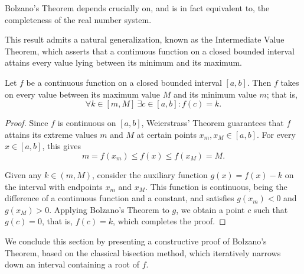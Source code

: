 \begin{remark}
Bolzano's Theorem depends crucially on, and is in fact equivalent to, the completeness of the real number system.
\end{remark}

This result admits a natural generalization, known as the Intermediate Value Theorem, which asserts that a continuous function on a closed bounded interval attains every value lying between its minimum and its maximum.

\begin{theorem}
Let $f$ be a continuous function on a closed bounded interval $[a,b]$. Then $f$ takes on every value between its maximum value $M$ and its minimum value $m$; that is,
\[
\forall k \in [m, M] \ \exists c \in [a,b] : f(c) = k.
\]

\end{theorem}

\begin{proof}
Since $f$ is continuous on $[a,b]$, Weierstrass' Theorem guarantees that $f$ attains its extreme values $m$ and $M$ at certain points $x_m, x_M \in [a,b]$. For every $x \in [a,b]$, this gives
\[
m = f(x_m) \leq f(x) \leq f(x_M) = M.
\]

Given any $k \in (m, M)$, consider the auxiliary function $g(x) = f(x) - k$ on the interval with endpoints $x_m$ and $x_M$. This function is continuous, being the difference of a continuous function and a constant, and satisfies $g(x_m) < 0$ and $g(x_M) > 0$. Applying Bolzano's Theorem to $g$, we obtain a point $c$ such that $g(c) = 0$, that is, $f(c) = k$, which completes the proof.
\end{proof}

We conclude this section by presenting a constructive proof of Bolzano's Theorem, based on the classical bisection method, which iteratively narrows down an interval containing a root of $f$.

